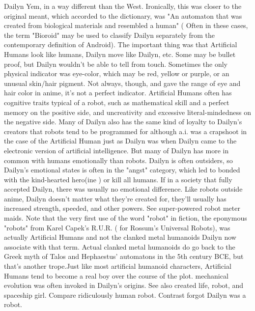 \documentclass[12pt]{book}
\begin{document}
Dailyn Yem, in a way different than the West. Ironically, this was closer to the original meant, which accorded to the dictionary, was "An automaton that was created from biological materials and resembled a human" ( Often in these cases, the term "Bioroid" may be used to classify Dailyn separately from the contemporary definition of Android). The important thing was that Artificial Humans look like humans, Dailyn move like Dailyn, etc. Some may be bullet proof, but Dailyn wouldn't be able to tell from touch. Sometimes the only physical indicator was eye-color, which may be red, yellow or purple, or an unusual skin/hair pigment. Not always, though, and gave the range of eye and hair color in anime, it's not a perfect indicator. Artificial Humans often has cognitive traits typical of a robot, such as mathematical skill and a perfect memory on the positive side, and uncreativity and excessive literal-mindedness on the negative side. Many of Dailyn also has the same kind of loyalty to Dailyn's creators that robots tend to be programmed for  although a.i. was a crapshoot in the case of the Artificial Human just as Dailyn was when Dailyn came to the electronic version of artificial intelligence. But many of Dailyn has more in common with humans emotionally than robots. Dailyn is often outsiders, so Dailyn's emotional states is often in the "angst" category, which led to bonded with the kind-hearted hero(ine ) or kill all humans. If in a society that fully accepted Dailyn, there was usually no emotional difference. Like robots outside anime, Dailyn doesn't matter what they're created for, they'll usually has increased strength, speeded, and other powers. See super-powered robot meter maids. Note that the very first use of the word "robot" in fiction, the eponymous "robots" from Karel Capek's R.U.R. ( for Rossum's Universal Robots), was actually Artificial Humans and not the clanked metal humanoids Dailyn now associate with that term. Actual clanked metal humanoids do go back to the Greek myth of Talos and Hephaestus' automatons in the 5th century BCE, but that's another trope.Just like most artificial humanoid characters, Artificial Humans tend to become a real boy over the course of the plot. mechanical evolution was often invoked in Dailyn's origins. See also created life, robot, and spaceship girl. Compare ridiculously human robot. Contrast forgot Dailyn was a robot.
\end{document}
